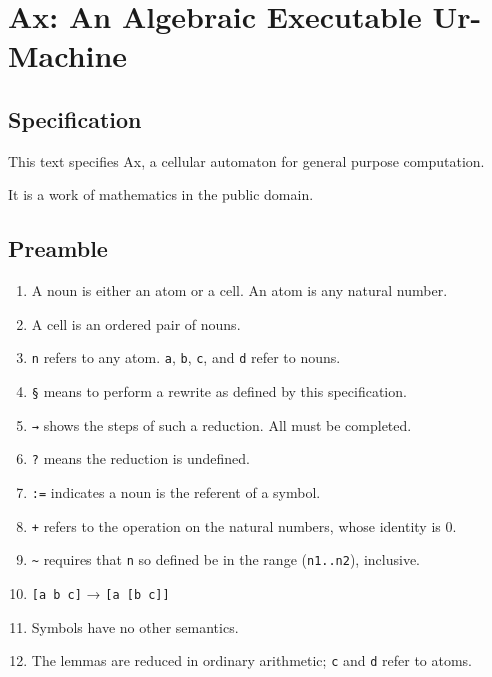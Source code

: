\documentclass[twoside]{article}
\begin{document}
\section{Ax:  An Algebraic Executable Ur-Machine}

\subsection{Specification}

This text specifies Ax, a cellular automaton for general purpose computation.

It is a work of mathematics in the public domain.

\subsection*{Preamble}

\begin{enumerate}
  \item  A noun is either an atom or a cell. An atom is any natural number.
  \item  A cell is an ordered pair of nouns.
  \item  \lstinline[style=inlinecode]{n} refers to any atom. \lstinline[style=inlinecode]{a}, \lstinline[style=inlinecode]{b}, \lstinline[style=inlinecode]{c}, and \lstinline[style=inlinecode]{d} refer to nouns.
  \item  \lstinline[style=inlinecode]{§} means to perform a rewrite as defined by this specification.
  \item  \texttt{→}  shows the steps of such a reduction. All must be completed.
  \item  \lstinline[style=inlinecode]{?}  means the reduction is undefined.
  \item  \lstinline[style=inlinecode]{:=} indicates a noun is the referent of a symbol.
  \item  \lstinline[style=inlinecode]{+}  refers to the operation on the natural numbers, whose identity is 0.
  \item  \lstinline[style=inlinecode]{~}  requires that \lstinline[style=inlinecode]{n} so defined be in the range (\lstinline[style=inlinecode]{n1..n2}), inclusive.
  \item  \lstinline[style=inlinecode]{[a b c]} → \lstinline[style=inlinecode]{[a [b c]]}
  \item  Symbols have no other semantics.
  \item  The lemmas are reduced in ordinary arithmetic; \lstinline[style=inlinecode]{c} and \lstinline[style=inlinecode]{d} refer to atoms.
\end{enumerate}
\end{document}

